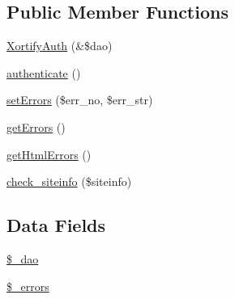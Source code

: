 \subsection*{Public Member Functions}
\begin{DoxyCompactItemize}
\item 
\hyperlink{class_xortify_auth_a726d2829d96759ca86f62e9990b10a15}{Xortify\-Auth} (\&\$dao)
\item 
\hyperlink{class_xortify_auth_a750c93a7dfab5314f2bf662a407bc5a6}{authenticate} ()
\item 
\hyperlink{class_xortify_auth_a84268a33f3ed3114bd0b08404e48893f}{set\-Errors} (\$err\-\_\-no, \$err\-\_\-str)
\item 
\hyperlink{class_xortify_auth_a6e548ebf2656742bfd19939ead923ed2}{get\-Errors} ()
\item 
\hyperlink{class_xortify_auth_a10ee66ee5b086b4e6692174531af900e}{get\-Html\-Errors} ()
\item 
\hyperlink{class_xortify_auth_a9d67d9bde367762a7a27e279e3cfcdf3}{check\-\_\-siteinfo} (\$siteinfo)
\end{DoxyCompactItemize}
\subsection*{Data Fields}
\begin{DoxyCompactItemize}
\item 
\hyperlink{class_xortify_auth_a12a029c610f699b4b25e79a1f64a3485}{\$\-\_\-dao}
\item 
\hyperlink{class_xortify_auth_a09272cb16edd572f760a622f37cee6d1}{\$\-\_\-errors}
\end{DoxyCompactItemize}


